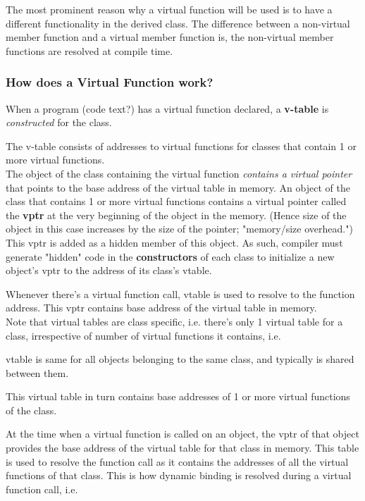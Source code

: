 \documentclass[10pt]{amsart}
\begin{document}
\begin{multicols*}{2}
The most prominent reason why a virtual function will be used is to have a different functionality in the derived class.  The difference between a non-virtual member function and a virtual member function is, the non-virtual member functions are resolved at compile time.  

\subsubsection{How does a Virtual Function work?}  

When a program (code text?) has a virtual function declared, a \textbf{v-table} is \emph{constructed} for the class.  

The v-table consists of addresses to virtual functions for classes that contain 1 or more virtual functions.  \\
The object of the class containing the virtual function \emph{contains a virtual pointer} that points to the base address of the virtual table in memory.  An object of the class that contains 1 or more virtual functions contains a virtual pointer called the \textbf{vptr} at the very beginning of the object in the memory.  (Hence size of the object in this case increases by the size of the pointer; "memory/size overhead.")  \\

This vptr is added as a hidden member of this object.  As such, compiler must generate "hidden" code in the \textbf{constructors} of each class to initialize a new object's vptr to the address of its class's vtable.  


Whenever there's a virtual function call, vtable is used to resolve to the function address.  
This vptr contains base address of the virtual table in memory.  \\

Note that virtual tables are class specific, i.e. there's only 1 virtual table for a class, irrespective of number of virtual functions it contains, i.e.  

vtable is same for all objects belonging to the same class, and typically is shared between them.    

This virtual table in turn contains base addresses of 1 or more virtual functions of the class.  

At the time when a virtual function is called on an object, the vptr of that object provides the base address of the virtual table for that class in memory.  This table is used to resolve the function call as it contains the addresses of all the virtual functions of that class.  This is how dynamic binding is resolved during a virtual function call, i.e.  


\end{multicols*}
\end{document}

